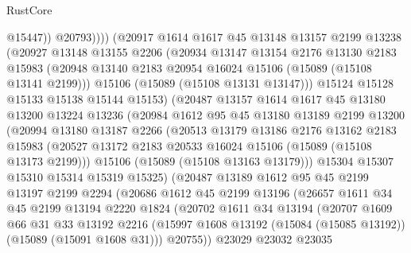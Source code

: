 \begin{lexlean}{RustCore}
\begin{coremodule}
                    @15447))
                @20793))))
        (@20917
          @1614
          @1617
          @45
          @13148
          @13157
          @2199
          @13238
          (@20927
            @13148
            @13155
            @2206
            (@20934
              @13147
              @13154
              @2176
              @13130
              @2183
              @15983
              (@20948 @13140 @2183 @20954 @16024 @15106 (@15089 (@15108 @13141 @2199)))
              @15106
              (@15089 (@15108 @13131 @13147)))
            @15124
            @15128
            @15133
            @15138
            @15144
            @15153)
          (@20487
            @13157
            @1614
            @1617
            @45
            @13180
            @13200
            @13224
            @13236
            (@20984
              @1612
              @95
              @45
              @13180
              @13189
              @2199
              @13200
              (@20994
                @13180
                @13187
                @2266
                (@20513
                  @13179
                  @13186
                  @2176
                  @13162
                  @2183
                  @15983
                  (@20527 @13172 @2183 @20533 @16024 @15106 (@15089 (@15108 @13173 @2199)))
                  @15106
                  (@15089 (@15108 @13163 @13179)))
                @15304
                @15307
                @15310
                @15314
                @15319
                @15325)
              (@20487
                @13189
                @1612
                @95
                @45
                @2199
                @13197
                @2199
                @2294
                (@20686
                  @1612
                  @45
                  @2199
                  @13196
                  (@26657
                    @1611
                    @34
                    @45
                    @2199
                    @13194
                    @2220
                    @1824
                    (@20702
                      @1611
                      @34
                      @13194
                      (@20707
                        @1609
                        @66
                        @31
                        @33
                        @13192
                        @2216
                        (@15997 @1608 @13192 (@15084 (@15085 @13192)) (@15089 (@15091 @1608 @31)))
                        @20755))
                    @23029
                    @23032
                    @23035

\end{coremodule}
\end{lexlean}
